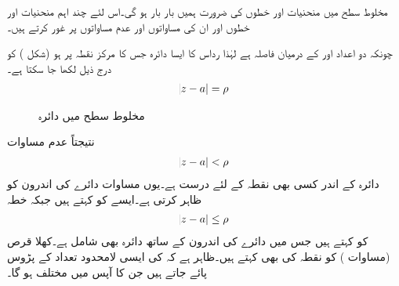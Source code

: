 مخلوط سطح  میں منحنیات اور خطوں کی ضرورت ہمیں بار بار ہو گی۔اس لئے چند اہم منحنیات اور خطوں اور ان کی مساواتوں اور عدم مساواتوں  پر غور کرتے ہیں۔

چونکہ دو اعداد  اور  کے درمیان فاصلہ  ہے لہٰذا رداس  کا ایسا دائرہ  جس کا مرکز نقطہ  پر ہو (شکل ) کو درج ذیل لکھا جا سکتا ہے۔
\begin{align}\label{مساوات_مخلوط_سطح_دائرہ_الف}
\abs{z-a}=\rho
\end{align} 
%
\begin{figure}
\centering
{}
\caption{مخلوط سطح میں دائرہ}
\label{شکل_مخلوط_سطح_دائرہ}
\end{figure}

نتیجتاً عدم مساوات
\begin{align}\label{مساوات_مخلوط_سطح_دائرہ_ب}
\abs{z-a}<\rho
\end{align}
دائرہ  کے اندر کسی بھی نقطہ کے لئے درست ہے۔یوں مساوات  دائرے کی اندرون کو ظاہر کرتی ہے۔ایسے   کو  کہتے ہیں جبکہ خطہ
\begin{align}\label{مساوات_مخلوط_سطح_دائرہ_پ}
\abs{z-a}\le \rho
\end{align}
کو  کہتے ہیں جس میں دائرے کی اندرون کے ساتھ دائرہ بھی شامل ہے۔کھلا قرص  (مساوات ) کو نقطہ  کی  بھی کہتے ہیں۔ظاہر ہے کہ  کی ایسی لامحدود تعداد کے پڑوس پائے جاتے ہیں جن کا  آپس میں مختلف ہو گا۔


